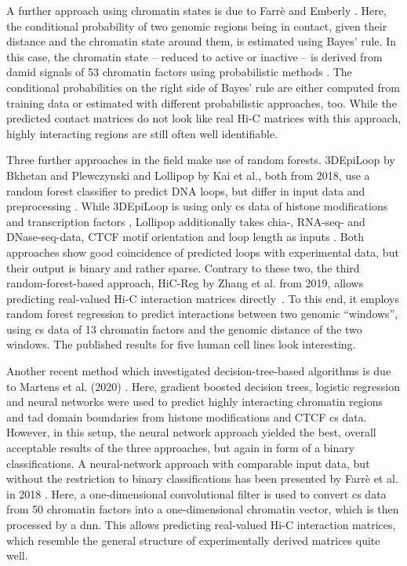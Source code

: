 A further approach using chromatin states is due to Farr\`e and Emberly \cite{Farre2018}.
Here, the conditional probability of two genomic regions being in contact, given their distance and the chromatin state around them,
is estimated using Bayes' rule. 
In this case, the chromatin state -- reduced to active or inactive -- is derived from \acrfull{damid} signals of 53 chromatin factors using probabilistic methods \cite{Zhou2016}.
The conditional probabilities on the right side of Bayes' rule are either computed from training data or estimated with different probabilistic approaches, too.
While the predicted contact matrices do not look like real Hi-C matrices with this approach, highly interacting regions are still often well identifiable.

Three further approaches in the field make use of random forests. 
3DEpiLoop by Bkhetan and Plewczynski and Lollipop by Kai et al., 
both from 2018, use a random forest classifier to predict DNA loops, but differ in input data and preprocessing  \cite{Bkhetan2018, Kai2018}.
While 3DEpiLoop is using only \acrshort{cs} data of histone modifications and transcription factors \cite{Bkhetan2018},
Lollipop additionally takes \acrshort{chia}-, RNA-seq- and DNase-seq-data, CTCF motif orientation and loop length as inputs \cite{Kai2018}.
Both approaches show good coincidence of predicted loops with experimental data, but their output is binary and rather sparse.
Contrary to these two, the third random-forest-based approach, HiC-Reg by Zhang et al. from 2019, allows predicting real-valued
Hi-C interaction matrices directly~\cite{Zhang2019}. To this end, it employs random forest regression to predict interactions
between two genomic ``windows'', using \acrshort{cs} data of 13 chromatin factors and the genomic distance of the two windows.
The published results for five human cell lines look interesting.

Another recent method which investigated decision-tree-based algorithms is due to Martens et al. (2020) \cite{Martens2020}.
Here, gradient boosted decision trees, logistic regression and neural networks were used to predict highly interacting chromatin regions
and \acrshort{tad} domain boundaries from histone modifications and CTCF \acrshort{cs} data. 
However, in this setup, the neural network approach yielded the best, overall acceptable results of the three approaches,
but again in form of a binary classifications.
A neural-network approach with comparable input data, but without the restriction to binary classifications has been presented by Farr\`e et al. in 2018 \cite{Farre2018a}. 
Here, a one-dimensional convolutional filter is used to convert \acrshort{cs} data from 50 chromatin factors into a 
one-dimensional chromatin vector, which is then processed by a \acrfull{dnn}.
This allows predicting real-valued Hi-C interaction matrices, which resemble the general structure of experimentally derived matrices quite well.

